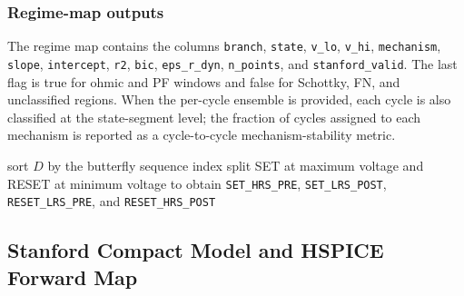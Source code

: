 \documentclass[journal]{IEEEtran}
\begin{document}
\subsubsection{Regime-map outputs}
The regime map contains the columns
\texttt{branch}, \texttt{state}, \texttt{v\_lo}, \texttt{v\_hi},
\texttt{mechanism}, \texttt{slope}, \texttt{intercept}, \texttt{r2},
\texttt{bic}, \texttt{eps\_r\_dyn}, \texttt{n\_points}, and
\texttt{stanford\_valid}.  The last flag is true for ohmic and PF windows and
false for Schottky, FN, and unclassified regions.  When the per-cycle ensemble
is provided, each cycle is also classified at the state-segment level; the
fraction of cycles assigned to each mechanism is reported as a
cycle-to-cycle mechanism-stability metric.

\begin{algorithm}[!t]
\caption{Conduction-regime classification}
\label{alg:regimes}
\footnotesize
{}
sort $D$ by the butterfly sequence index\;
split SET at maximum voltage and RESET at minimum voltage to obtain
\texttt{SET\_HRS\_PRE}, \texttt{SET\_LRS\_POST},
\texttt{RESET\_LRS\_PRE}, and \texttt{RESET\_HRS\_POST}\;
\end{algorithm}

\subsection{Stanford Compact Model and HSPICE Forward Map}
\label{sec:model}
\end{document}
